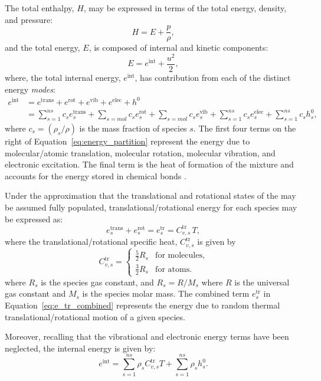\documentclass[10pt]{article}
\begin{document}
The total enthalpy, $H$, may be expressed in terms of the total energy, density, and pressure:
$$H = E + \dfrac{p}{\rho},$$
and the total energy, $E$, is composed of internal and kinetic components: $$E = e^{\text{int}} + \dfrac{ u^2 }{2},$$
where, the total internal energy, $e^{\text{int}}$, has contribution from each of the distinct energy \emph{modes}:%
\begin{align}
 e^{\text{int}} &= e^{\text{trans}} + e^{\text{rot}} + e^{\text{vib}} + e^{\text{elec}} + h^0 \\
 &= \sum_{s=1}^{ns} c_s e^{\text{trans}}_s + \sum_{s=mol} c_s e^{\text{rot}}_s + \sum_{s=mol} c_s e^{\text{vib}}_s + \sum_{s=1}^{ns} c_s e^{\text{elec}}_s + \sum_{s=1}^{ns} c_s h^0_s ,
\label{eq:energy_partition}
\end{align}
where $c_s=\left(\rho_s/\rho\right)$ is the mass fraction of species $s$. 
The first four terms on the right of Equation~\eqref{eq:energy_partition} represent the energy due to molecular/atomic translation, molecular rotation, molecular vibration, and electronic excitation. The final term is the heat of formation of the mixture and accounts for the energy stored in chemical bonds \citep{Ait1996,Kirk2009}.

Under the approximation that the translational and rotational states of the may be assumed fully populated, translational/rotational energy for each species may be expressed as:
\begin{equation}
 \label{eq:e_tr_combined}
 e^{\text{trans}}_s + e^{\text{rot}}_s = e^{\text{tr}}_s = C^{\text{tr}}_{v,s}\, T ,
\end{equation}
where the translational/rotational specific heat, $C^{\text{tr}}_{v,s}$ is given by
\begin{equation}
 C^{\text{tr}}_{v,s} =
 \begin{cases}
 \frac{5}{2} R_s & \text{for molecules}, \\
 \frac{3}{2} R_s & \text{for atoms.}
 \end{cases}
\end{equation}
where $R_s$ is the species gas constant, and $R_s = R/M_s$ where $R$ is the universal gas constant and $M_s$ is the species molar mass. The combined term $e^{\text{tr}}_s$ in Equation~\eqref{eq:e_tr_combined} represents the energy due to random thermal translational/rotational motion of a given species.

Moreover, recalling that the vibrational and electronic energy terms have been neglected, the internal energy is given by:
\begin{equation}
 \label{eq:rE-T-Tv-relationship}
 e^{\text{int}} = \sum_{s=1}^{ns} \rho_s C^{\text{tr}}_{v,s} T + \sum_{s=1}^{ns} \rho_s h^0_s .
\end{equation}
\end{document}
